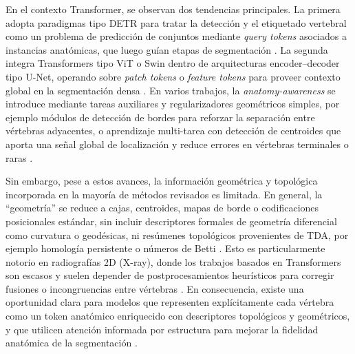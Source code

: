 \documentclass[conference]{IEEEtran}
\begin{document}
En el contexto Transformer, se observan dos tendencias principales. La primera adopta paradigmas tipo DETR para tratar la detección y el etiquetado vertebral como un problema de predicción de conjuntos mediante \emph{query tokens} asociados a instancias anatómicas, que luego guían etapas de segmentación \cite{tao2022spine_transformers}. La segunda integra Transformers tipo ViT o Swin dentro de arquitecturas encoder--decoder tipo U-Net, operando sobre \emph{patch tokens} o \emph{feature tokens} para proveer contexto global en la segmentación densa \cite{you2022eg_trans3dunet,you2023verteformer,zhang2023swinspine}. En varios trabajos, la \emph{anatomy-awareness} se introduce mediante tareas auxiliares y regularizadores geométricos simples, por ejemplo módulos de detección de bordes para reforzar la separación entre vértebras adyacentes, o aprendizaje multi-tarea con detección de centroides que aporta una señal global de localización y reduce errores en vértebras terminales o raras \cite{you2022eg_trans3dunet,aydogdu2024centroid,li2024verformer}.

Sin embargo, pese a estos avances, la información geométrica y topológica incorporada en la mayoría de métodos revisados es limitada. En general, la ``geometría'' se reduce a cajas, centroides, mapas de borde o codificaciones posicionales estándar, sin incluir descriptores formales de geometría diferencial como curvatura o geodésicas, ni resúmenes topológicos provenientes de TDA, por ejemplo homología persistente o números de Betti \cite{tao2022spine_transformers,you2023verteformer,li2024verformer,aydogdu2024centroid}. Esto es particularmente notorio en radiografías 2D (X-ray), donde los trabajos basados en Transformers son escasos y suelen depender de postprocesamientos heurísticos para corregir fusiones o incongruencias entre vértebras \cite{zhang2022xray_transformer,aydogdu2024centroid}. En consecuencia, existe una oportunidad clara para modelos que representen explícitamente cada vértebra como un token anatómico enriquecido con descriptores topológicos y geométricos, y que utilicen atención informada por estructura para mejorar la fidelidad anatómica de la segmentación \cite{clough2020topological,hu2019topology}.
\end{document}
